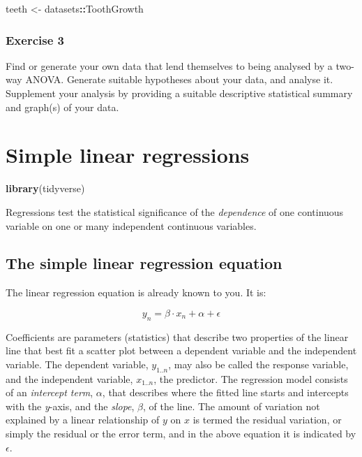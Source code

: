 \documentclass[english,10pt,a4paper,oneside]{book}
\newenvironment{Shaded}{\begin{snugshade}}{\end{snugshade}}
\newcommand{\KeywordTok}[1]{\textcolor[rgb]{0.13,0.29,0.53}{\textbf{#1}}}
\newcommand{\NormalTok}[1]{#1}
\newcommand{\OperatorTok}[1]{\textcolor[rgb]{0.81,0.36,0.00}{\textbf{#1}}}
\newcommand{\StringTok}[1]{\textcolor[rgb]{0.31,0.60,0.02}{#1}}
\theoremstyle{definition}
\theoremstyle{definition}
\theoremstyle{definition}
\theoremstyle{remark}
\begin{document}
\begin{Shaded}
\begin{Highlighting}[]
\NormalTok{teeth <-}\StringTok{ }\NormalTok{datasets}\OperatorTok{::}\NormalTok{ToothGrowth}
\end{Highlighting}
\end{Shaded}

\hypertarget{exercise-3}{%
\subsection{Exercise 3}\label{exercise-3}}

Find or generate your own data that lend themselves to being analysed by
a two-way ANOVA. Generate suitable hypotheses about your data, and
analyse it. Supplement your analysis by providing a suitable descriptive
statistical summary and graph(s) of your data.

\hypertarget{simple-linear-regressions}{%
\chapter{Simple linear regressions}\label{simple-linear-regressions}}

\begin{Shaded}
\begin{Highlighting}[]
\KeywordTok{library}\NormalTok{(tidyverse)}
\end{Highlighting}
\end{Shaded}

Regressions test the statistical significance of the \emph{dependence}
of one continuous variable on one or many independent continuous
variables.

\hypertarget{the-simple-linear-regression-equation}{%
\section{The simple linear regression
equation}\label{the-simple-linear-regression-equation}}

The linear regression equation is already known to you. It is:

\[y_{n}=\beta \cdot x_{n}+\alpha+\epsilon\]

Coefficients are parameters (statistics) that describe two properties of
the linear line that best fit a scatter plot between a dependent
variable and the independent variable. The dependent variable,
\(y_{1..n}\), may also be called the response variable, and the
independent variable, \(x_{1..n}\), the predictor. The regression model
consists of an \emph{intercept term}, \(\alpha\), that describes where
the fitted line starts and intercepts with the \emph{y}-axis, and the
\emph{slope}, \(\beta\), of the line. The amount of variation not
explained by a linear relationship of \(y\) on \(x\) is termed the
residual variation, or simply the residual or the error term, and in the
above equation it is indicated by \(\epsilon\).
\end{document}
